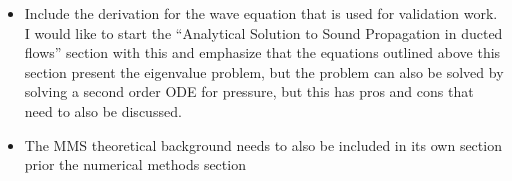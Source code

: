 \documentclass[a4paper]{article}
\begin{document}
\begin{itemize}
    \item Include the derivation for the wave equation that is used for validation
        work. I would like to start the ``Analytical Solution to Sound Propagation in 
        ducted flows'' section with this and emphasize that the equations outlined 
        above this section present the  eigenvalue problem, but the problem 
        can also be solved by solving a second order ODE for pressure, but this 
        has pros and cons that need to also be discussed.  
    \item The MMS theoretical background needs to also be included in its own 
        section prior the numerical methods section
\end{itemize}
\end{document}
